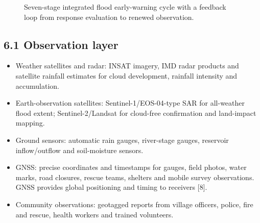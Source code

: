 \documentclass[11pt,a4paper]{article}
\begin{document}
\begin{figure}[H]
\centering
{}
\caption{Seven-stage integrated flood early-warning cycle with a feedback loop from response evaluation to renewed observation.}
\label{fig:early-warning-cycle}
\end{figure}

\subsection{6.1 Observation layer}\label{observation-layer}

\begin{itemize}
\item
  Weather satellites and radar: INSAT imagery, IMD radar products and satellite rainfall estimates for cloud development, rainfall intensity and accumulation.
\item
  Earth-observation satellites: Sentinel-1/EOS-04-type SAR for all-weather flood extent; Sentinel-2/Landsat for cloud-free confirmation and land-impact mapping.
\item
  Ground sensors: automatic rain gauges, river-stage gauges, reservoir inflow/outflow and soil-moisture sensors.
\item
  GNSS: precise coordinates and timestamps for gauges, field photos, water marks, road closures, rescue teams, shelters and mobile survey observations. GNSS provides global positioning and timing to receivers {[}8{]}.
\item
  Community observations: geotagged reports from village officers, police, fire and rescue, health workers and trained volunteers.
\end{itemize}
\end{document}
